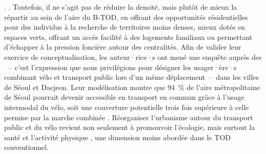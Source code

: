 \begin{refsegment}
{     \textcolor{blue}{\autocite[983]{lee_bicycle-based_2016}}.
} \textcolor{blue}{\autocite[983]{lee_bicycle-based_2016}}. Toutefois, il ne s’agit pas de réduire la densité, mais plutôt de mieux la répartir au sein de l’aire du \acrshort{B-TOD}, en offrant des opportunités résidentielles pour des individus à la recherche de territoires moins denses, mieux dotés en espaces verts, offrant un accès facilité à des logements familiaux ou permettant d’échapper à la pression foncière autour des centralités. Afin de valider leur exercice de conceptualisation, les auteur·rice·s ont mené une enquête auprès des ~–~c’est l'expression que nous privilégions pour désigner les usager·ère·s combinant vélo et transport public lors d’un même déplacement~–~dans les villes de Séoul et Daejeon. Leur modélisation montre que 94~\% de l’aire métropolitaine de Séoul pourrait devenir accessible en transport en commun grâce à l’usage intermodal du vélo, soit une couverture potentielle trois fois supérieure à celle permise par la marche combinée \textcolor{blue}{\autocite[982]{lee_bicycle-based_2016}}. Réorganiser l'urbanisme autour du transport public et du vélo revient non seulement à promouvoir l'écologie, mais surtout la santé et l'activité physique \textcolor{blue}{\autocite[44]{heran_velo_2020}}, une dimension moins abordée dans le \acrshort{TOD} conventionnel.%


\end{refsegment}
